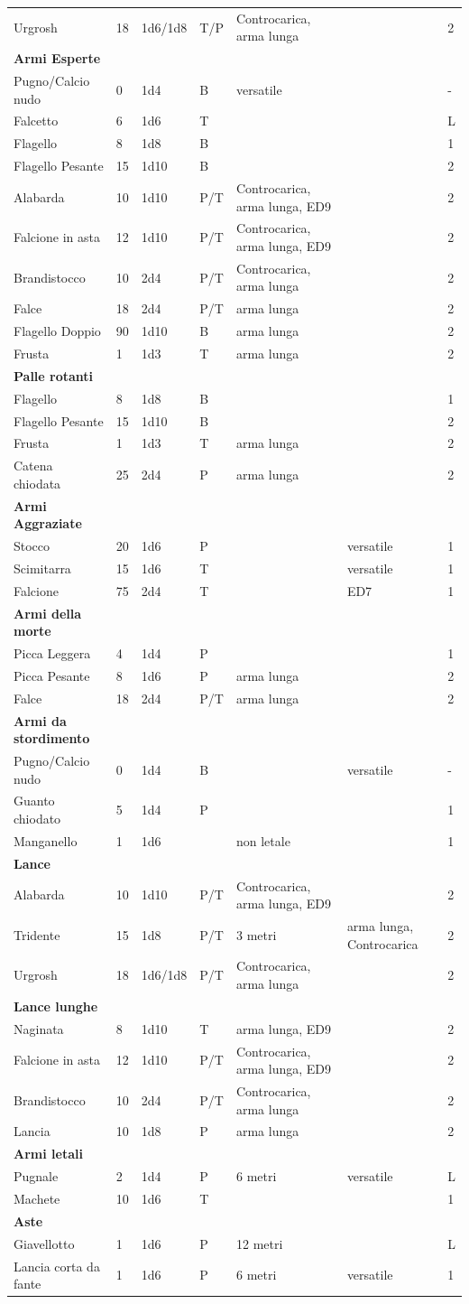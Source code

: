 \documentclass[a4paper,11pt,twoside,openany]{book}
\begin{document}
{\begin{longtable}{|L{3.5cm} |k{1,3cm} |k{1.5cm}| k{1.3cm} |L{3.2cm} |k{2.7cm}|k{2cm}|}
	Urgrosh & 18 & 1d6/1d8 & T/P & Controcarica, arma lunga & &2\tabularnewline
	\textbf{Armi Esperte} & & & & & &\tabularnewline
	Pugno/Calcio nudo & 0 & 1d4 & B & versatile & &-\tabularnewline
	Falcetto & 6 & 1d6 & T & & &L\tabularnewline
	Flagello & 8 & 1d8 & B & & &1\tabularnewline
	Flagello Pesante & 15 & 1d10 & B & & &2\tabularnewline
	Alabarda & 10 & 1d10 & P/T & Controcarica, arma lunga, ED9 & &2\tabularnewline
	Falcione in asta & 12 & 1d10 & P/T & Controcarica, arma lunga, ED9 & &2\tabularnewline
	Brandistocco & 10 & 2d4 & P/T & Controcarica, arma lunga & &2\tabularnewline
	Falce & 18 & 2d4 & P/T & arma lunga & &2\tabularnewline
	Flagello Doppio & 90 & 1d10 & B & arma lunga & &2\tabularnewline
	Frusta & 1 & 1d3 & T & arma lunga & &2\tabularnewline
	\textbf{Palle rotanti} & & & & & &\tabularnewline
	Flagello & 8 & 1d8 & B & & &1\tabularnewline
	Flagello Pesante & 15 & 1d10 & B & & &2\tabularnewline
	Frusta & 1 & 1d3 & T & arma lunga & &2\tabularnewline
	Catena chiodata & 25 & 2d4 & P & arma lunga & &2\tabularnewline
	\textbf{Armi Aggraziate} & & & & & &\tabularnewline
	Stocco & 20 & 1d6 & P & & versatile&1\tabularnewline
	Scimitarra & 15 & 1d6 & T & & versatile&1\tabularnewline
	Falcione & 75 & 2d4 & T & & ED7&1\tabularnewline
	\textbf{Armi della morte} & & & & & &\tabularnewline
	Picca Leggera & 4 & 1d4 & P & & &1\tabularnewline
	Picca Pesante & 8 & 1d6 & P & arma lunga & &2\tabularnewline
	Falce & 18 & 2d4 & P/T & arma lunga & &2\tabularnewline
	\textbf{Armi da stordimento} & & & & && \tabularnewline
	Pugno/Calcio nudo & 0 & 1d4 & B & & versatile&-\tabularnewline
	Guanto chiodato & 5 & 1d4 & P & & &1\tabularnewline
	Manganello & 1 & 1d6 & & non letale & &1\tabularnewline
	\textbf{Lance} & & & & & &\tabularnewline
	Alabarda & 10 & 1d10 & P/T & Controcarica, arma lunga, ED9 & &2\tabularnewline
	Tridente & 15 & 1d8 & P/T & 3 metri & arma lunga, Controcarica &2\tabularnewline
	Urgrosh & 18 & 1d6/1d8 & P/T & Controcarica, arma lunga & &2\tabularnewline
	\textbf{Lance lunghe} & & & & & &\tabularnewline
	Naginata & 8 & 1d10 & T & arma lunga, ED9 & &2\tabularnewline
	Falcione in asta & 12 & 1d10 & P/T & Controcarica, arma lunga, ED9 & &2\tabularnewline
	Brandistocco & 10 & 2d4 & P/T & Controcarica, arma lunga & &2\tabularnewline
	Lancia & 10 & 1d8 & P & arma lunga & &2\tabularnewline
	\textbf{Armi letali} & & & & & &\tabularnewline
	Pugnale & 2 & 1d4 & P & 6 metri & versatile&L\tabularnewline
	Machete & 10 & 1d6 & T & & &1\tabularnewline
	\textbf{Aste} & & & & & &\tabularnewline
	Giavellotto & 1 & 1d6 & P & 12 metri & &L\tabularnewline
	Lancia corta da fante & 1 & 1d6 & P & 6 metri & versatile&1\tabularnewline

\end{longtable}}
\end{document}
